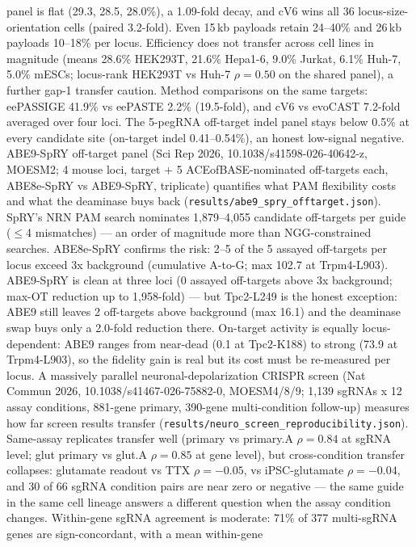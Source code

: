 \documentclass[12pt]{article}
\begin{document}
panel is flat (29.3, 28.5, 28.0\%), a 1.09-fold decay, and cV6 wins
all 36 locus-size-orientation cells (paired 3.2-fold). Even 15\,kb
payloads retain 24--40\% and 26\,kb payloads 10--18\% per locus.
Efficiency does not transfer across cell lines in magnitude (means
28.6\% HEK293T, 21.6\% Hepa1-6, 9.0\% Jurkat, 6.1\% Huh-7,
5.0\% mESCs; locus-rank HEK293T vs Huh-7 $\rho=0.50$ on the shared
panel), a further gap-1 transfer caution. Method comparisons on the
same targets: eePASSIGE 41.9\% vs eePASTE 2.2\% (19.5-fold), and cV6
vs evoCAST 7.2-fold averaged over four loci. The 5-pegRNA off-target
indel panel stays below 0.5\% at every candidate site (on-target
indel 0.41--0.54\%), an honest low-signal negative.
ABE9-SpRY off-target panel (Sci Rep 2026, 10.1038/s41598-026-40642-z,
MOESM2; 4 mouse loci, target + 5 ACEofBASE-nominated off-targets each,
ABE8e-SpRY vs ABE9-SpRY, triplicate) quantifies what PAM flexibility
costs and what the deaminase buys back
(\texttt{results/abe9\_spry\_offtarget.json}). SpRY's NRN PAM search
nominates 1{,}879--4{,}055 candidate off-targets per guide ($\leq$4
mismatches) --- an order of magnitude more than NGG-constrained
searches. ABE8e-SpRY confirms the risk: 2--5 of the 5 assayed
off-targets per locus exceed 3x background (cumulative A-to-G; max
102.7 at Trpm4-L903). ABE9-SpRY is clean at three loci (0 assayed
off-targets above 3x background; max-OT reduction up to
1{,}958-fold) --- but Tpc2-L249 is the honest exception: ABE9 still
leaves 2 off-targets above background (max 16.1) and the deaminase
swap buys only a 2.0-fold reduction there. On-target activity is
equally locus-dependent: ABE9 ranges from near-dead (0.1 at
Tpc2-K188) to strong (73.9 at Trpm4-L903), so the fidelity gain is
real but its cost must be re-measured per locus.
A massively parallel neuronal-depolarization CRISPR screen (Nat
Commun 2026, 10.1038/s41467-026-75882-0, MOESM4/8/9; 1{,}139 sgRNAs x
12 assay conditions, 881-gene primary, 390-gene multi-condition
follow-up) measures how far screen results transfer
(\texttt{results/neuro\_screen\_reproducibility.json}). Same-assay
replicates transfer well (primary vs primary.A $\rho=0.84$ at
sgRNA level; glut primary vs glut.A $\rho=0.85$ at gene level), but
cross-condition transfer collapses: glutamate readout vs TTX
$\rho=-0.05$, vs iPSC-glutamate $\rho=-0.04$, and 30 of 66 sgRNA
condition pairs are near zero or negative --- the same guide in the
same cell lineage answers a different question when the assay
condition changes. Within-gene sgRNA agreement is moderate: 71\% of
377 multi-sgRNA genes are sign-concordant, with a mean within-gene
\end{document}
